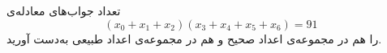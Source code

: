 \EXERCISE
تعداد جواب‌های معادله‌ی
$$(x_0 + x_1 + x_2)(x_3 + x_4 + x_5 + x_6) = 91$$
را هم در مجموعه‌ی اعداد صحیح و هم در مجموعه‌ی اعداد طبیعی به‌دست آورید.